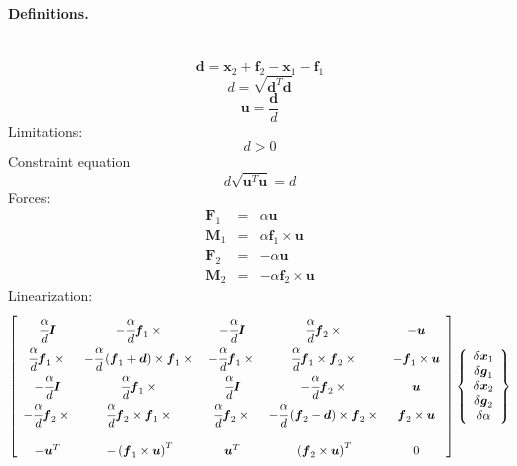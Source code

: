 \documentclass[10pt,dvips,fleqn,subeqn]{report}
\newcommand{\T}[1]{\boldsymbol{#1}}
\begin{document}
\paragraph{Definitions.} \
\begin{equation}
	\T{d} = \T{x}_2 + \T{f}_2 - \T{x}_1 - \T{f}_1
\end{equation}
\begin{equation}
	d = \sqrt{\T{d}^T \T{d}}
\end{equation}
\begin{equation}
	\T{u} = \frac{\T{d}}{d}
\end{equation}
Limitations:
\begin{equation}
	d > 0
\end{equation}
Constraint equation 
\begin{equation}
	d \sqrt{\T{u}^T \T{u}} = d
\end{equation}
Forces:
\begin{eqnarray}
	\T{F}_1 & = & \alpha \T{u} \\
	\T{M}_1 & = & \alpha \T{f}_1 \times \T{u} \\
	\T{F}_2 & = & -\alpha \T{u} \\
	\T{M}_2 & = & -\alpha \T{f}_2 \times \T{u}
\end{eqnarray}
Linearization:
\begin{equation}
	\sqbr{\matr{ccccc}{
		\cfrac{\alpha}{d}\T{I} & -\cfrac{\alpha}{d}\T{f}_1\times{} &
			-\cfrac{\alpha}{d}\T{I} & \cfrac{\alpha}{d}\T{f}_2\times{} & -\T{u} \\
		\cfrac{\alpha}{d}\T{f}_1\times{} & 
			-\cfrac{\alpha}{d}\plbr{\T{f}_1 + \T{d}}\times\T{f}_1\times{} &
			-\cfrac{\alpha}{d}\T{f}_1\times{} & 
			\cfrac{\alpha}{d}\T{f}_1\times\T{f}_2\times{} & 
			-\T{f}_1\times\T{u} \\
		-\cfrac{\alpha}{d}\T{I} & \cfrac{\alpha}{d}\T{f}_1\times{} &
			\cfrac{\alpha}{d}\T{I} & -\cfrac{\alpha}{d}\T{f}_2\times{} & \T{u} \\
		-\cfrac{\alpha}{d}\T{f}_2\times{} &
			\cfrac{\alpha}{d}\T{f}_2\times\T{f}_1\times{} &
			\cfrac{\alpha}{d}\T{f}_2\times{} &
			- \cfrac{\alpha}{d}\plbr{\T{f}_2 - \T{d}}\times{\T{f}_2\times{}} &
			\T{f}_2\times\T{u} \\
		\\
		-\T{u}^T & - \plbr{\T{f}_1\times\T{u}}^T & 
			\T{u}^T & \plbr{\T{f}_2\times\T{u}}^T & 0
	}}\cubr{\cvvect{
		\delta\T{x}_1 \\
		\delta\T{g}_1 \\
		\delta\T{x}_2 \\
		\delta\T{g}_2 \\
		\delta\alpha
	}}
\end{equation}
\end{document}
